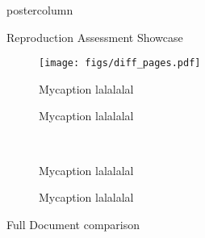 \begin{frame}
\begin{columns}
\begin{column}{.59\textwidth}
\begin{beamercolorbox}[center]{postercolumn}
\begin{minipage}{.98\textwidth}
{\begin{myblock}{Reproduction Assessment Showcase}
						\begin{minipage}{.58\textwidth}
						\begin{figure}
							\texttt{[image: figs/diff\_pages.pdf]}
							\vspace{0.2em}
							\caption{
								Mycaption lalalalal
							}
						\end{figure}
						\begin{figure}
							\vspace{0.2em}
							\caption{
								Mycaption lalalalal
							}
						\end{figure}
						\end{minipage}~
						\begin{minipage}{.38\textwidth}
						\begin{figure}
							\vspace{0.2em}
							\caption{
								Mycaption lalalalal
							}
						\end{figure}
						\begin{figure}
							\vspace{0.2em}
							\caption{
								Mycaption lalalalal
							}
						\end{figure}
						\end{minipage}
					\end{myblock}\vfill
					\begin{myblock}{Full Document comparison}
						\vspace{0.75em}
						\\
						\vspace{.3em}
					\end{myblock}\vfill
		}\end{minipage}\end{beamercolorbox}
	\end{column}
\end{columns}
\end{frame}

